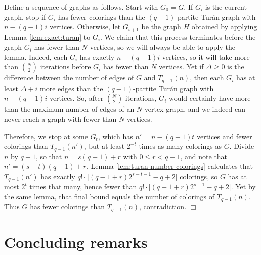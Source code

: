 \documentclass[11pt]{article}
\begin{document}
Define a sequence of graphs as follows.  Start with $G_0 = G$.  If
$G_i$ is the current graph, stop if $G_i$ has fewer colorings than the
$(q-1)$-partite Tur\'an graph with $n-(q-1)i$ vertices.  Otherwise,
let $G_{i+1}$ be the graph $H$ obtained by applying Lemma
\ref{lem:exact:turan} to $G_i$.  We claim that this process terminates
before the graph $G_i$ has fewer than $N$ vertices, so we will always
be able to apply the lemma.  Indeed, each $G_i$ has exactly $n-(q-1)i$
vertices, so it will take more than ${N \choose 2}$ iterations before
$G_i$ has fewer than $N$ vertices.  Yet if $\Delta \geq 0$ is the
difference between the number of edges of $G$ and $T_{q-1}(n)$, then
each $G_i$ has at least $\Delta+i$ more edges than the $(q-1)$-partite
Tur\'an graph with $n-(q-1)i$ vertices.  So, after ${N \choose 2}$
iterations, $G_i$ would certainly have more than the maximum number of
edges of an $N$-vertex graph, and we indeed can never reach a graph
with fewer than $N$ vertices.

Therefore, we stop at some $G_t$, which has $n' = n-(q-1)t$ vertices
and fewer colorings than $T_{q-1}(n')$, but at least $2^{-t}$ times as
many colorings as $G$.  Divide $n$ by $q-1$, so that $n = s(q-1) + r$
with $0 \leq r < q-1$, and note that $n' = (s-t)(q-1) + r$.  Lemma
\ref{lem:turan-number-colorings} calculates that $T_{q-1}(n')$ has
exactly $q! \cdot \big[ (q-1+r)2^{s-t-1} - q + 2 \big]$ colorings, so
$G$ has at most $2^t$ times that many, hence fewer than $q! \cdot
\big[ (q-1+r)2^{s-1} - q + 2 \big]$.  Yet by the same lemma, that
final bound equals the number of colorings of $T_{q-1}(n)$.  Thus $G$
has fewer colorings than $T_{q-1}(n)$, contradiction.  \hfill $\Box$






\section{Concluding remarks}
\end{document}
